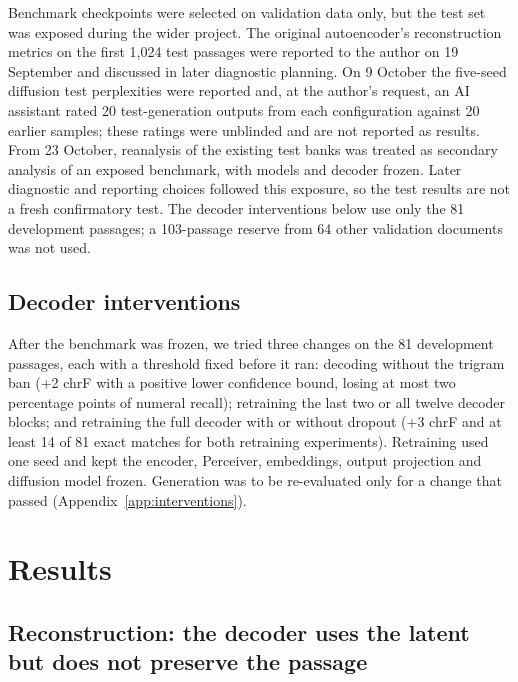 \documentclass[11pt,a4paper]{article}
\begin{document}
Benchmark checkpoints were selected on validation data only, but the test set was exposed during the wider project. The original autoencoder's reconstruction metrics on the first 1,024 test passages were reported to the author on 19 September and discussed in later diagnostic planning. On 9 October the five-seed diffusion test perplexities were reported and, at the author's request, an AI assistant rated 20 test-generation outputs from each configuration against 20 earlier samples; these ratings were unblinded and are not reported as results. From 23 October, reanalysis of the existing test banks was treated as secondary analysis of an exposed benchmark, with models and decoder frozen. Later diagnostic and reporting choices followed this exposure, so the test results are not a fresh confirmatory test. The decoder interventions below use only the 81 development passages; a 103-passage reserve from 64 other validation documents was not used.

\subsection{Decoder interventions}
After the benchmark was frozen, we tried three changes on the 81 development passages, each with a threshold fixed before it ran: decoding without the trigram ban (+2 chrF with a positive lower confidence bound, losing at most two percentage points of numeral recall); retraining the last two or all twelve decoder blocks; and retraining the full decoder with or without dropout (+3 chrF and at least 14 of 81 exact matches for both retraining experiments). Retraining used one seed and kept the encoder, Perceiver, embeddings, output projection and diffusion model frozen. Generation was to be re-evaluated only for a change that passed (Appendix~\ref{app:interventions}).

\section{Results}
\label{sec:results}

\subsection{Reconstruction: the decoder uses the latent but does not preserve the passage}
\label{sec:res-recon}
\end{document}
